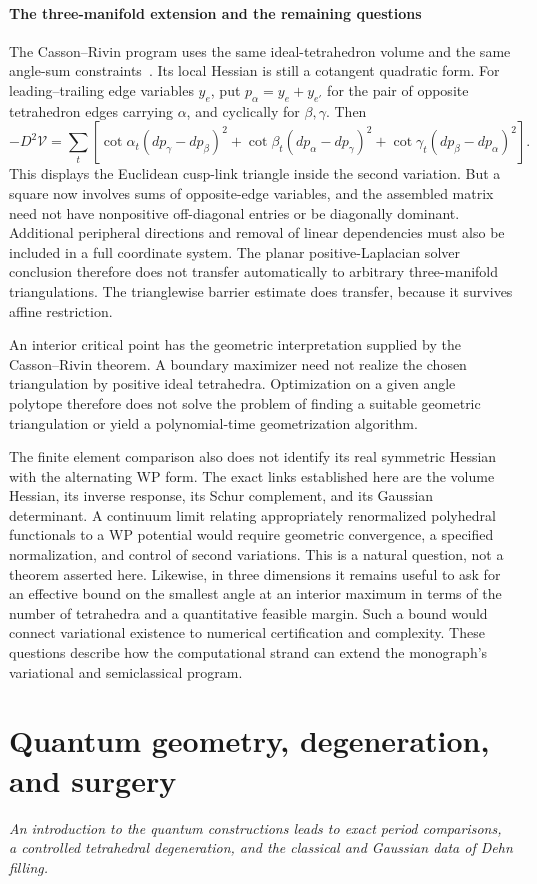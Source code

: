\documentclass[11pt,a4paper]{article}
\newcommand{\monographpart}[2]{%
  \clearpage\part{#1}%
  \noindent\textit{#2}\par\medskip}
\numberwithin{equation}{section}
\theoremstyle{definition}
\theoremstyle{remark}
\begin{document}
\subsection{The three-manifold extension and the remaining questions}

The Casson--Rivin program uses the same ideal-tetrahedron volume and the
same angle-sum constraints~\cite{FuterGueritaud}. Its local Hessian is
still a cotangent quadratic form. For leading--trailing edge variables
$y_e$, put $p_\alpha=y_e+y_{e'}$ for the pair of opposite tetrahedron
edges carrying $\alpha$, and cyclically for $\beta,\gamma$. Then
\begin{equation}
 -D^2\mathcal V
 =\sum_t\left[
 \cot\alpha_t(dp_\gamma-dp_\beta)^2
 +\cot\beta_t(dp_\alpha-dp_\gamma)^2
 +\cot\gamma_t(dp_\beta-dp_\alpha)^2\right].
 \label{eq:ipolyThreeDimensionalHessian}
\end{equation}
This displays the Euclidean cusp-link triangle inside the second
variation. But a square now involves sums of opposite-edge variables,
and the assembled matrix need not have nonpositive off-diagonal entries
or be diagonally dominant. Additional peripheral directions and removal
of linear dependencies must also be included in a full coordinate
system. The planar positive-Laplacian solver conclusion therefore does
not transfer automatically to arbitrary three-manifold triangulations.
The trianglewise barrier estimate does transfer, because it survives
affine restriction.

An interior critical point has the geometric interpretation supplied by
the Casson--Rivin theorem. A boundary maximizer need not realize the
chosen triangulation by positive ideal tetrahedra. Optimization on a
given angle polytope therefore does not solve the problem of finding
a suitable geometric triangulation or yield a polynomial-time
geometrization algorithm.

The finite element comparison also does not identify its real symmetric
Hessian with the alternating WP form. The exact links established here
are the volume Hessian, its inverse response, its Schur complement,
and its Gaussian determinant. A continuum limit relating appropriately
renormalized polyhedral functionals to a WP potential would require
geometric convergence, a specified normalization, and control of second
variations. This is a natural question, not a theorem asserted here.
Likewise, in three dimensions it remains useful to ask for an effective
bound on the smallest angle at an interior maximum in terms of the
number of tetrahedra and a quantitative feasible margin. Such a bound
would connect variational existence to numerical certification and
complexity. These questions describe how the computational strand can
extend the monograph's variational and semiclassical program.

\monographpart{Quantum geometry, degeneration, and surgery}{An introduction to the quantum constructions leads to exact period comparisons, a controlled tetrahedral degeneration, and the classical and Gaussian data of Dehn filling.}
\end{document}

